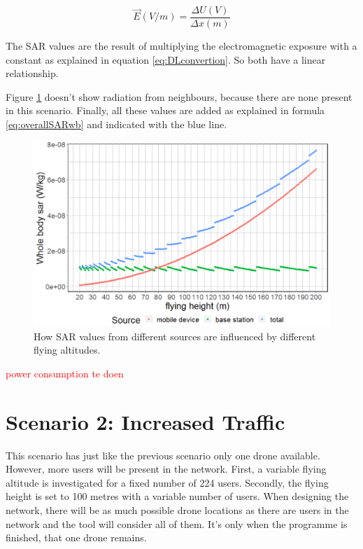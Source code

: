 \begin{equation}
\vec{E} (V/m) = \frac{\Delta U (V) }{\Delta x (m)}
\label{eq:exposureBasicFormula}
\end{equation}

The SAR values are the result of multiplying the electromagnetic exposure with a constant as explained in equation \ref{eq:DLconvertion}.
So both have a linear relationship.

Figure \ref{fig:s1_fhsar} doesn't show radiation from neighbours, because there are none present in this scenario. 
Finally, all these values are added as explained in formula \ref{eq:overallSARwb} and indicated with the blue line. 

\begin{figure}[]
  \includegraphics[width=\textwidth]{../results/s1/fhvssar2.png}
  \caption{How SAR values from different sources are influenced by different flying altitudes.}
  \label{fig:s1_fhsar}
\end{figure}

\textcolor{red}{power consumption te doen}
\FloatBarrier
\section{Scenario 2: Increased Traffic}

This scenario has just like the previous scenario only one drone available. However, more users will be present in the network.
First, a variable flying altitude is investigated for a fixed number of 224 users. 
Secondly, the flying height is set to 100 metres with a variable number of users.
When designing the network, there will be as much possible drone locations as there are users in the network and the tool
will consider all of them. It's only when the programme is finished, that one drone remains.

